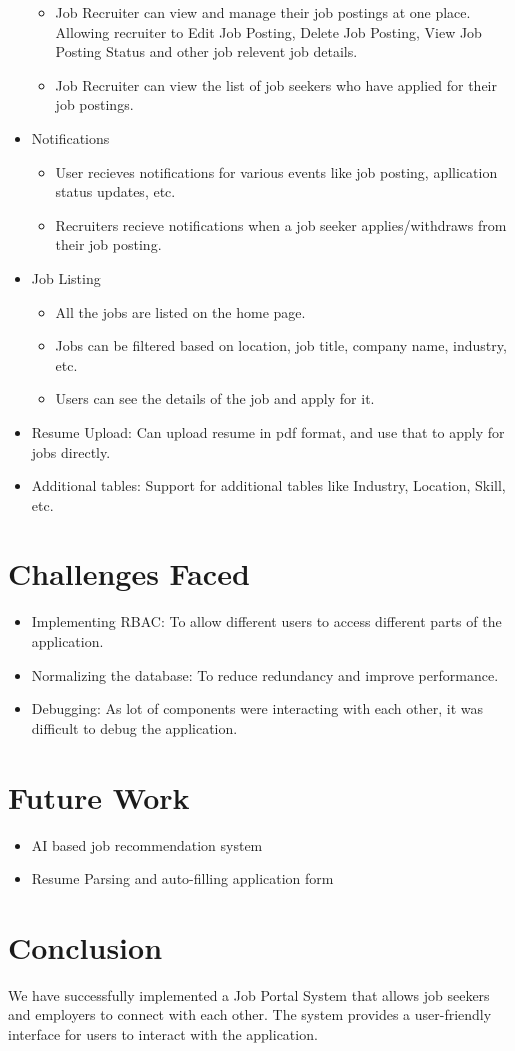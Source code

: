 \documentclass[12pt]{article}
\begin{document}
\begin{itemize}
\begin{itemize}
        \item Job Recruiter can view and manage their job postings at one place. Allowing recruiter to Edit Job Posting, Delete Job Posting, View Job Posting Status and other job relevent job details.
        \item Job Recruiter can view the list of job seekers who have applied for their job postings.
    \end{itemize}
    \item Notifications
    \begin{itemize}
        \item User recieves notifications for various events like job posting, apllication status updates, etc.
        \item Recruiters recieve notifications when a job seeker applies/withdraws from their job posting.
    \end{itemize}
    \item Job Listing
    \begin{itemize}
        \item All the jobs are listed on the home page.
        \item Jobs can be filtered based on location, job title, company name, industry, etc.
        \item Users can see the details of the job and apply for it.
    \end{itemize}
    \item Resume Upload: Can upload resume in pdf format, and use that to apply for jobs directly.
    \item Additional tables: Support for additional tables like Industry, Location, Skill, etc.
\end{itemize}

\section*{Challenges Faced}
\begin{itemize}
    \item Implementing RBAC: To allow different users to access different parts of the application.
    \item Normalizing the database: To reduce redundancy and improve performance.
    \item Debugging: As lot of components were interacting with each other, it was difficult to debug the application.
\end{itemize}

\section*{Future Work}
\begin{itemize}
    \item AI based job recommendation system
    \item Resume Parsing and auto-filling application form
\end{itemize}

\section*{Conclusion}
We have successfully implemented a Job Portal System that allows job seekers and employers to connect with each other. The system provides a user-friendly interface for users to interact with the application.
\end{document}
